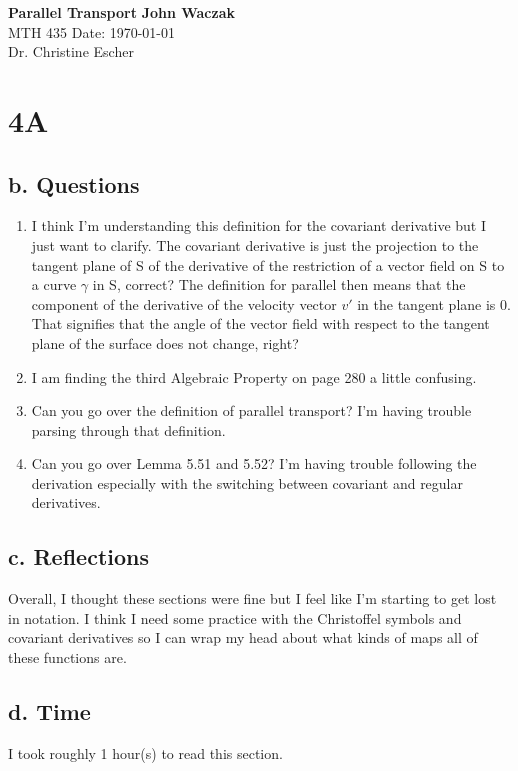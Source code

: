 \documentclass[a4paper, 11pt]{article}
\begin{document}
\noindent
\large\textbf{Parallel Transport} \hfill \textbf{John Waczak} \\
\normalsize MTH 435 \hfill  Date: \today \\
Dr. Christine Escher \\

\section*{4A}
\subsection*{b. Questions}
	\begin{enumerate}
		\item I think I'm understanding this definition for the covariant derivative but I just want to clarify. The covariant derivative is just the projection to the tangent plane of S of the derivative of the restriction of a vector field on S to a curve $\gamma$ in S, correct? The definition for parallel then means that the component of the derivative of the velocity vector $v'$ in the tangent plane is 0. That signifies that the angle of the vector field with respect to the tangent plane of the surface does not change, right? 
		\item I am finding the third Algebraic Property on page 280 a little confusing. 
		\item Can you go over the definition of parallel transport? I'm having trouble parsing through that definition. 
		\item Can you go over Lemma 5.51 and 5.52? I'm having trouble following the derivation especially with the switching between covariant and regular derivatives. 
	\end{enumerate}
\subsection*{c. Reflections}
		Overall, I thought these sections were fine but I feel like I'm starting to get lost in notation. I think I need some practice with the Christoffel symbols and covariant derivatives so I can wrap my head about what kinds of maps all of these functions are. 
\subsection*{d. Time}
I took roughly 1 hour(s) to read this section. 
\end{document}

